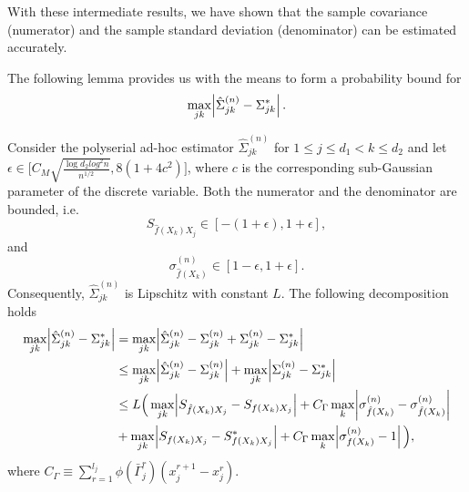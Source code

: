 With these intermediate results, we have shown that the sample covariance (numerator) and the sample standard deviation (denominator) can be estimated accurately.

The following lemma provides us with the means to form a probability bound for
\begin{equation*}
    \max_{jk}\abs{\hat{\Sigma}_{jk}^{(n)} -  \Sigma_{jk}^{*}}.
\end{equation*}


\begin{lemma}
    Consider the polyserial ad-hoc estimator $\hat{\Sigma}_{jk}^{(n)}$ for $1 \leq j \leq d_1 < k \leq d_2$ and let $\epsilon \in \Big[ C_M\sqrt{\frac{\log d_2 log^2 n}{n^{1/2}}}, 8(1+4c^2)\Big]$, where $c$ is the corresponding sub-Gaussian parameter of the discrete variable.
    Both the numerator and the denominator are bounded, i.e.
    \begin{equation*}
        S_{\hat{f}(X_k)X_j} \in [-(1 + \epsilon), 1 + \epsilon],
    \end{equation*}
    and
    \begin{equation*}
        \sigma_{\hat{f}(X_k)}^{(n)} \in [1-\epsilon, 1+\epsilon].
    \end{equation*}
    Consequently, $\hat{\Sigma}_{jk}^{(n)}$ is Lipschitz with constant $L$. The following decomposition holds
    \begin{align*}
        \max_{jk}\abs{\hat{\Sigma}_{jk}^{(n)} -  \Sigma_{jk}^{*}} & =  \max_{jk}\abs{\hat{\Sigma}_{jk}^{(n)} - {\Sigma}_{jk}^{(n)} + {\Sigma}_{jk}^{(n)} - \Sigma_{jk}^{*}}                                                  \\
                                                                  & \leq \max_{jk}\abs{\hat{\Sigma}_{jk}^{(n)} - {\Sigma}_{jk}^{(n)}} + \max_{jk}\abs{{\Sigma}_{jk}^{(n)} - \Sigma_{jk}^{*}}                                 \\
                                                                  & \leq L \Big( \max_{jk} \abs{S_{\hat{f}(X_k)X_j} - S_{{f}(X_k)X_j} } + C_\Gamma \max_{k} \abs{\sigma_{\hat{f}(X_k)}^{(n)} - \sigma_{\hat{f}(X_k)}^{(n)} } \\
                                                                  & +  \max_{jk} \abs{S_{{f}(X_k)X_j} - S^*_{{f}(X_k)X_j}}  + C_\Gamma \max_{k} \abs{\sigma^{(n)}_{{f}(X_k)} - 1} \Big),
    \end{align*}
    where $C_\Gamma \equiv \sum_{r=1}^{l_{j}} \phi(\bar{\Gamma}_j^r)(x_j^{r+1} - x_j^r)$.
\end{lemma}


